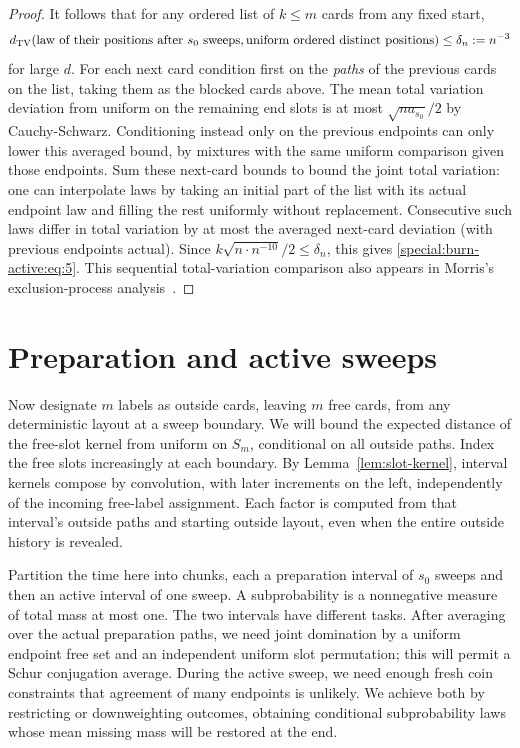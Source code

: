 \begin{proof}
It follows that for any ordered list of \(k\le m\) cards from any fixed start,
\begin{equation}
 d_{\rm TV}(\text{law of their positions after }s_0\text{ sweeps},
            \text{uniform ordered distinct positions})\le\delta_n:=n^{-3} \label{special:burn-active:eq:5}
\end{equation}
for large \(d\). For each next card condition first on the \emph{paths} of the previous cards on the list, taking them as the blocked cards above. The mean total variation deviation from uniform on the remaining end slots is at most \(\sqrt{n a_{s_0}}/2\) by Cauchy-Schwarz. Conditioning instead only on the previous endpoints can only lower this averaged bound, by mixtures with the same uniform comparison given those endpoints. Sum these next-card bounds to bound the joint total variation: one can interpolate laws by taking an initial part of the list with its actual endpoint law and filling the rest uniformly without replacement. Consecutive such laws differ in total variation by at most the averaged next-card deviation (with previous endpoints actual). Since \(k\sqrt{n\cdot n^{-10}}/2\le \delta_n\), this gives \eqref{special:burn-active:eq:5}. This sequential total-variation comparison also appears in Morris's exclusion-process analysis~\cite[Lemma~12]{morris-exclusion2006}.

\end{proof}

\section{Preparation and active sweeps}\label{sec:burn}

Now designate \(m\) labels as outside cards, leaving \(m\) free cards, from any deterministic layout at a sweep boundary. We will bound the expected distance of the free-slot kernel from uniform on \(S_m\), conditional on all outside paths. Index the free slots increasingly at each boundary. By Lemma~\ref{lem:slot-kernel}, interval kernels compose by convolution, with later increments on the left, independently of the incoming free-label assignment. Each factor is computed from that interval's outside paths and starting outside layout, even when the entire outside history is revealed.

Partition the time here into chunks, each a preparation interval of \(s_0\) sweeps and then an active interval of one sweep. A subprobability is a nonnegative measure of total mass at most one. The two intervals have different tasks. After averaging over the actual preparation paths, we need joint domination by a uniform endpoint free set and an independent uniform slot permutation; this will permit a Schur conjugation average. During the active sweep, we need enough fresh coin constraints that agreement of many endpoints is unlikely. We achieve both by restricting or downweighting outcomes, obtaining conditional subprobability laws whose mean missing mass will be restored at the end.


